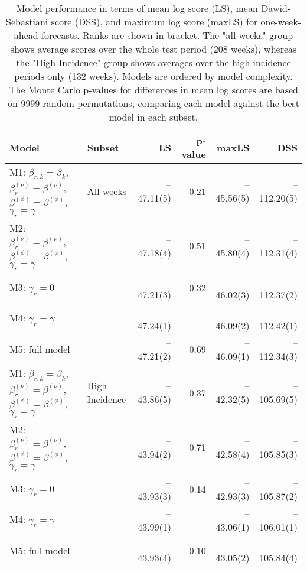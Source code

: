 \begin{table}[ht]
\centering
\begingroup\fontsize{9pt}{10pt}\selectfont
\begin{tabular}{ll|rrrr}
  \hline
Model & Subset & LS & p-value & maxLS & DSS \\ 
  \hline
M1: $\beta_{r,k} = \beta_{k}$, $\beta_{r}^{(\nu)} = \beta^{(\nu)}$, $\beta^{(\phi)} = \beta^{(\phi)}$, $\gamma_r = \gamma$ & All weeks & --47.11(5) & 0.21 & --45.56(5) & --112.20(5) \\ 
  M2: $\beta_{r}^{(\nu)} = \beta^{(\nu)}$, $\beta^{(\phi)} = \beta^{(\phi)}$, $\gamma_r = \gamma$ &  & --47.18(4) & 0.51 & --45.80(4) & --112.31(4) \\ 
  M3: $\gamma_r = 0$ &  & --47.21(3) & 0.32 & --46.02(3) & --112.37(2) \\ 
  M4: $\gamma_r = \gamma$ &  & --47.24(1) &  & --46.09(2) & --112.42(1) \\ 
  M5: full model &  & --47.21(2) & 0.69 & --46.09(1) & --112.34(3) \\ 
   \hline
M1: $\beta_{r,k} = \beta_{k}$, $\beta_{r}^{(\nu)} = \beta^{(\nu)}$, $\beta^{(\phi)} = \beta^{(\phi)}$, $\gamma_r = \gamma$ & High Incidence & --43.86(5) & 0.37 & --42.32(5) & --105.69(5) \\ 
  M2: $\beta_{r}^{(\nu)} = \beta^{(\nu)}$, $\beta^{(\phi)} = \beta^{(\phi)}$, $\gamma_r = \gamma$ &  & --43.94(2) & 0.71 & --42.58(4) & --105.85(3) \\ 
  M3: $\gamma_r = 0$ &  & --43.93(3) & 0.14 & --42.93(3) & --105.87(2) \\ 
  M4: $\gamma_r = \gamma$ &  & --43.99(1) &  & --43.06(1) & --106.01(1) \\ 
  M5: full model &  & --43.93(4) & 0.10 & --43.05(2) & --105.84(4) \\ 
   \hline
\end{tabular}
\endgroup
\caption{Model performance in terms of mean log score (LS), 
             mean Dawid-Sebastiani score (DSS), and maximum log score (maxLS) 
             for one-week-ahead forecasts.
             Ranks are shown in bracket.
             The "all weeks" group shows average scores over the 
             whole test period (208 weeks), 
             whereas the "High Incidence" group shows
             averages over the high incidence periods only (132 weeks).
             Models are ordered by model complexity.
             The Monte Carlo p-values for differences in mean log scores
             are based on 9999 random permutations,
             comparing each model against the best model in each subset.} 
\label{tab:forecast}
\end{table}
